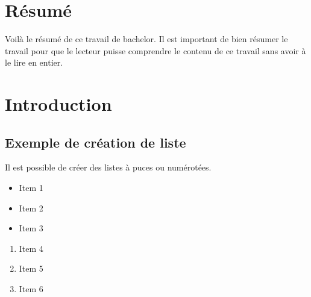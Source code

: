 \documentclass[12pt]{article}
\begin{document}
\newpage

\section{Résumé}
Voilà le résumé de ce travail de bachelor. Il est important de bien résumer le travail pour que le lecteur puisse comprendre le contenu de ce travail sans avoir à le lire en entier.


\newpage

\listoftables

\newpage

\listoffigures

\newpage

\tableofcontents
\newpage


\section{Introduction}
\subsection{Exemple de création de liste}

Il est possible de créer des listes à puces ou numérotées.

\begin{itemize}
    \item Item 1
    \item Item 2
    \item Item 3
\end{itemize}

\begin{enumerate}
    \item Item 4
    \item Item 5
    \item Item 6
\end{enumerate}
\end{document}
